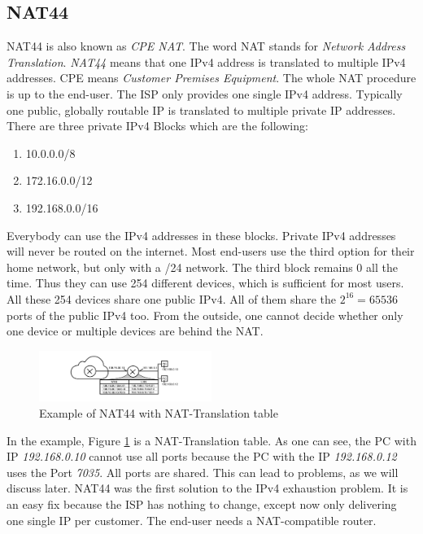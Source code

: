 \documentclass[format=sigconf, natbib=true, nonacm=true]{acmart}
\begin{document}
    \subsection{NAT44}
    NAT44 is also known as \textit{CPE NAT}. The word NAT stands for \textit{Network Address Translation}. \textit{NAT44} means that one IPv4 address is translated to multiple IPv4 addresses. CPE means \textit{Customer Premises Equipment}. The whole NAT procedure is up to the end-user. The ISP only provides one single IPv4 address. Typically one public, globally routable IP is translated to multiple private IP addresses. There are three private IPv4 Blocks which are the following:
    \begin{enumerate}
        \item 10.0.0.0/8
        \item 172.16.0.0/12
        \item 192.168.0.0/16
    \end{enumerate}
    Everybody can use the IPv4 addresses in these blocks. Private IPv4 addresses will never be routed on the internet. Most end-users use the third option for their home network, but only with a /24 network. The third block remains 0 all the time. Thus they can use 254 different devices, which is sufficient for most users. All these 254 devices share one public IPv4. All of them share the $2^{16} = 65536$ ports of the public IPv4 too. From the outside, one cannot decide whether only one device or multiple devices are behind the NAT.
    \begin{figure}
        \centering
        \includegraphics[width=0.5\textwidth]{images/nat_44.png}
        \caption{Example of NAT44 with NAT-Translation table}
        \label{fig:nat_44}
    \end{figure}
    In the example, Figure \ref{fig:nat_44} is a NAT-Translation table. As one can see, the PC with IP \textit{192.168.0.10} cannot use all ports because the PC with the IP \textit{192.168.0.12} uses the Port \textit{7035}. All ports are shared. This can lead to problems, as we will discuss later. NAT44 was the first solution to the IPv4 exhaustion problem. It is an easy fix because the ISP has nothing to change, except now only delivering one single IP per customer. The end-user needs a NAT-compatible router.
\end{document}

